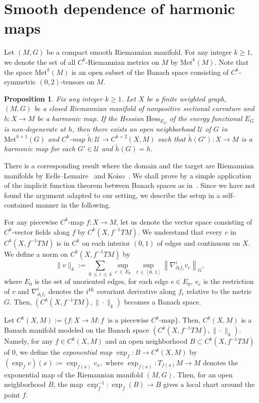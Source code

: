 \documentclass[11pt]{article}
\newtheorem{prop}[theo]{Proposition}
\theoremstyle{definition}
\numberwithin{equation}{section}
\newcommand{\p}{\psi}
\newcommand*\Uc{\mathcal{U}}
\newcommand*\Hess{\mathrm{Hess}}
\newcommand*\Met{\mathrm{Met}}
\newcommand*\wt{\widetilde}
\renewcommand*\p{\partial}
\begin{document}
\section{Smooth dependence of harmonic maps}\label{AppB}

Let $(M,G)$ be a compact smooth Riemannian manifold. For any integer $k\geq 1$, we denote the set of all $C^k$-Riemannian metrics on $M$ by $\Met^k(M)$. Note that the space $\Met^k(M)$ is an open subset of the Banach space consisting of $C^k$-symmetric $(0,2)$-tensors on $M$.

\begin{prop}\label{smooth dependence}
Fix any integer $k \ge 1$. Let $X$ be a finite weighted graph, $(M, G)$ be a closed Riemannian manifold of nonpositive sectional curvature and $h: X\to M$ be a harmonic map. If the Hessian $\Hess_{E_G}$ of the energy functional $E_G$ is non-degenerate at $h$, then there exists an open neighborhood $\Uc$ of $G$ in $\Met^{k+1}(G)$ and $C^k$-map $\wt h:\Uc \to C^{k+2}(X, M)$ such that $\wt h(G'):X \to M$ is a harmonic map for each $G' \in \Uc$ and $\wt h(G)=h$.
\end{prop}

There is a corresponding result where the domain and the target are Riemannian manifolds by Eells--Lemaire~\cite[Theorem~3.1]{EL} and Koiso~\cite[Theorem~4.7]{Koiso}. We shall prove by a simple application of the implicit function theorem between Banach spaces as in~\cite{EL}. Since we have not found the argument adapted to our setting, we describe the setup in a self-contained manner in the following.



For any piecewise $C^k$-map $f:X \to M$, let us denote the vector space consisting of $C^k$-vector fields along $f$ by $C^k(X, f^{-1}TM)$. We understand that every $v$ in $C^k(X, f^{-1}TM)$ is in $C^k$ on each interior $(0, 1)$ of edges and continuous on $X$. We define a norm on $C^k(X, f^{-1}TM)$ by
\[
\|v\|_k:=\sum_{0\,\leq\,i\,\leq\,k}\underset{e\,\in\,E_0}\sup\;\sup_{t\,\in\,[0,\, 1]}\left\|\nabla^i_{\p_t f_e} v_e\right\|_{G},
\]
where $E_0$ is the set of unoriented edges, for each edge $e\in E_0$, $v_e$ is the restriction of $v$ and $\nabla^i_{\p_t f_e}$ denotes the $i^{\rm th}$ covariant derivative along $f_e$ relative to the metric $G$. Then, $(C^k(X, f^{-1}TM), \|\cdot\|_k)$ becomes a Banach space.


Let $C^k(X, M):=\{f:X\to M: f\ \text{ is a piecewise $C^k$-map}\}$. Then, $C^k(X, M)$ is a Banach manifold modeled on the Banach space $(C^k(X, f^{-1}TM), \|\cdot \|_k)$. Namely, for any $f\in C^k(X, M)$ and an open neighborhood $B\subset C^k(X, f^{-1}TM)$ of $0$, we define the \emph{exponential map} ${\exp}_f:B\to C^k(X,M)$ by $ (\exp_fv)(x):=\exp_{f(x)}v_{x}, $ where $\exp_{f(x)}: T_{f(x)}M\to M$ denotes the exponential map of the Riemannian manifold $(M,G)$. Then, for an open neighborhood $B$, the map $\exp_f^{-1}: \exp_f(B)\to B$ gives a local chart around the point $f$.
\end{document}
